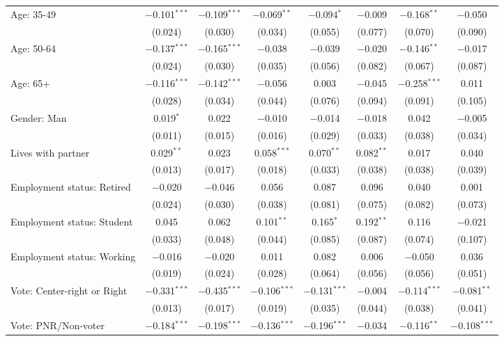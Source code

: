 \begin{tabular}{@{\extracolsep{5pt}}lccccccc}
  Age: 35-49 & $-$0.101$^{***}$ & $-$0.109$^{***}$ & $-$0.069$^{**}$ & $-$0.094$^{*}$ & $-$0.009 & $-$0.168$^{**}$ & $-$0.050 \\ 
  & (0.024) & (0.030) & (0.034) & (0.055) & (0.077) & (0.070) & (0.090) \\ 
  Age: 50-64 & $-$0.137$^{***}$ & $-$0.165$^{***}$ & $-$0.038 & $-$0.039 & $-$0.020 & $-$0.146$^{**}$ & $-$0.017 \\ 
  & (0.024) & (0.030) & (0.035) & (0.056) & (0.082) & (0.067) & (0.087) \\ 
  Age: 65+ & $-$0.116$^{***}$ & $-$0.142$^{***}$ & $-$0.056 & 0.003 & $-$0.045 & $-$0.258$^{***}$ & 0.011 \\ 
  & (0.028) & (0.034) & (0.044) & (0.076) & (0.094) & (0.091) & (0.105) \\ 
  Gender: Man & 0.019$^{*}$ & 0.022 & $-$0.010 & $-$0.014 & $-$0.018 & 0.042 & $-$0.005 \\ 
  & (0.011) & (0.015) & (0.016) & (0.029) & (0.033) & (0.038) & (0.034) \\ 
  Lives with partner & 0.029$^{**}$ & 0.023 & 0.058$^{***}$ & 0.070$^{**}$ & 0.082$^{**}$ & 0.017 & 0.040 \\ 
  & (0.013) & (0.017) & (0.018) & (0.033) & (0.038) & (0.038) & (0.039) \\ 
  Employment status: Retired & $-$0.020 & $-$0.046 & 0.056 & 0.087 & 0.096 & 0.040 & 0.001 \\ 
  & (0.024) & (0.030) & (0.038) & (0.081) & (0.075) & (0.082) & (0.073) \\ 
  Employment status: Student & 0.045 & 0.062 & 0.101$^{**}$ & 0.165$^{*}$ & 0.192$^{**}$ & 0.116 & $-$0.021 \\ 
  & (0.033) & (0.048) & (0.044) & (0.085) & (0.087) & (0.074) & (0.107) \\ 
  Employment status: Working & $-$0.016 & $-$0.020 & 0.011 & 0.082 & 0.006 & $-$0.050 & 0.036 \\ 
  & (0.019) & (0.024) & (0.028) & (0.064) & (0.056) & (0.056) & (0.051) \\ 
  Vote: Center-right or Right & $-$0.331$^{***}$ & $-$0.435$^{***}$ & $-$0.106$^{***}$ & $-$0.131$^{***}$ & $-$0.004 & $-$0.114$^{***}$ & $-$0.081$^{**}$ \\ 
  & (0.013) & (0.017) & (0.019) & (0.035) & (0.044) & (0.038) & (0.041) \\ 
  Vote: PNR/Non-voter & $-$0.184$^{***}$ & $-$0.198$^{***}$ & $-$0.136$^{***}$ & $-$0.196$^{***}$ & $-$0.034 & $-$0.116$^{**}$ & $-$0.108$^{***}$ \\ 

\end{tabular}

